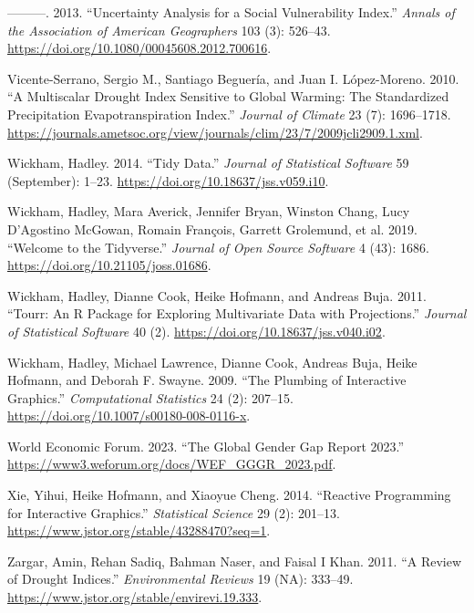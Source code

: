 \documentclass[
]{interact}
\newlength{\cslhangindent}
\newlength{\cslentryspacingunit} %
\newenvironment{CSLReferences}[2] %
 {%
  \setlength{\parindent}{0pt}
  \ifodd #1
  \let\oldpar\par
  \def\par{\hangindent=\cslhangindent\oldpar}
  \fi
  \setlength{\parskip}{#2\cslentryspacingunit}
 }%
 {}
\begin{document}
\begin{CSLReferences}{1}{0}
\leavevmode{}%
---------. 2013. {``Uncertainty {Analysis} for a {Social}
{Vulnerability} {Index}.''} \emph{Annals of the Association of American
Geographers} 103 (3): 526--43.
\url{https://doi.org/10.1080/00045608.2012.700616}.

\leavevmode{}%
Vicente-Serrano, Sergio M., Santiago Beguería, and Juan I. López-Moreno.
2010. {``A {Multiscalar} {Drought} {Index} {Sensitive} to {Global}
{Warming}: {The} {Standardized} {Precipitation} {Evapotranspiration}
{Index}.''} \emph{Journal of Climate} 23 (7): 1696--1718.
\url{https://journals.ametsoc.org/view/journals/clim/23/7/2009jcli2909.1.xml}.

\leavevmode{}%
Wickham, Hadley. 2014. {``Tidy {Data}.''} \emph{Journal of Statistical
Software} 59 (September): 1--23.
\url{https://doi.org/10.18637/jss.v059.i10}.

\leavevmode{}%
Wickham, Hadley, Mara Averick, Jennifer Bryan, Winston Chang, Lucy
D'Agostino McGowan, Romain François, Garrett Grolemund, et al. 2019.
{``Welcome to the {Tidyverse}.''} \emph{Journal of Open Source Software}
4 (43): 1686. \url{https://doi.org/10.21105/joss.01686}.

\leavevmode{}%
Wickham, Hadley, Dianne Cook, Heike Hofmann, and Andreas Buja. 2011.
{``Tourr: {An} {R} {Package} for {Exploring} {Multivariate} {Data} with
{Projections}.''} \emph{Journal of Statistical Software} 40 (2).
\url{https://doi.org/10.18637/jss.v040.i02}.

\leavevmode{}%
Wickham, Hadley, Michael Lawrence, Dianne Cook, Andreas Buja, Heike
Hofmann, and Deborah F. Swayne. 2009. {``The Plumbing of Interactive
Graphics.''} \emph{Computational Statistics} 24 (2): 207--15.
\url{https://doi.org/10.1007/s00180-008-0116-x}.

\leavevmode{}%
World Economic Forum. 2023. {``{The Global Gender Gap Report 2023}.''}
\url{https://www3.weforum.org/docs/WEF_GGGR_2023.pdf}.

\leavevmode{}%
Xie, Yihui, Heike Hofmann, and Xiaoyue Cheng. 2014. {``Reactive
{Programming} for {Interactive} {Graphics}.''} \emph{Statistical
Science} 29 (2): 201--13.
\url{https://www.jstor.org/stable/43288470?seq=1}.

\leavevmode{}%
Zargar, Amin, Rehan Sadiq, Bahman Naser, and Faisal I Khan. 2011. {``A
Review of Drought Indices.''} \emph{Environmental Reviews} 19 (NA):
333--49. \url{https://www.jstor.org/stable/envirevi.19.333}.

\end{CSLReferences}
\end{document}
